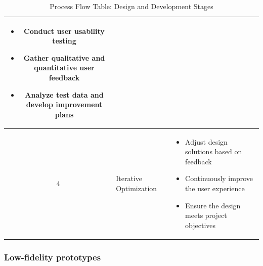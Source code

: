 \begin{table}[h!]
\begin{tabular}{|c|p{4cm}|p{10cm}|}
\begin{itemize}
                                                \item Conduct user usability testing
                                                \item Gather qualitative and quantitative user feedback
                                                \item Analyze test data and develop improvement plans
                                            \end{itemize}                                                                                  \\ \hline
    4             & Iterative Optimization       & \begin{itemize}
                                                    \item Adjust design solutions based on feedback
                                                    \item Continuously improve the user experience
                                                    \item Ensure the design meets project objectives
                                                \end{itemize}                                                                                  \\ \hline
    \end{tabular}
    \caption{Process Flow Table: Design and Development Stages}
    \label{tab:process_flow}
    \end{table}



\subsubsection{Low-fidelity prototypes}


